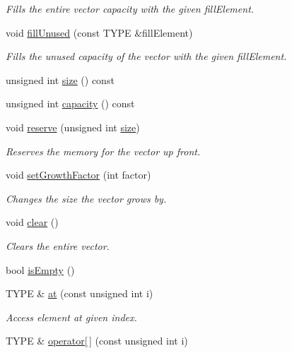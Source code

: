 \begin{DoxyCompactItemize}
\begin{DoxyCompactList}\small\item\em Fills the entire vector capacity with the given fill\+Element. \end{DoxyCompactList}\item 
void \hyperlink{classVECTOR_a82f4d38d7f35546e94e9d92654350c06}{fill\+Unused} (const T\+Y\+PE \&fill\+Element)
\begin{DoxyCompactList}\small\item\em Fills the unused capacity of the vector with the given fill\+Element. \end{DoxyCompactList}\item 
unsigned int \hyperlink{classVECTOR_a886dda1960ee8802b6151c66d531e01d}{size} () const 
\item 
unsigned int \hyperlink{classVECTOR_a6bc131f9067d07e45638247c95cc7ab0}{capacity} () const 
\item 
void \hyperlink{classVECTOR_a2e5af97d018d037dc6a0ceda0c3ed6c0}{reserve} (unsigned int \hyperlink{classVECTOR_a886dda1960ee8802b6151c66d531e01d}{size})
\begin{DoxyCompactList}\small\item\em Reserves the memory for the vector up front. \end{DoxyCompactList}\item 
void \hyperlink{classVECTOR_a74d13e9f54ae114408eb344b1918a1a4}{set\+Growth\+Factor} (int factor)
\begin{DoxyCompactList}\small\item\em Changes the size the vector grows by. \end{DoxyCompactList}\item 
void \hyperlink{classVECTOR_a0e2dc06d22af370c7f44f7b688a6ff6b}{clear} ()
\begin{DoxyCompactList}\small\item\em Clears the entire vector. \end{DoxyCompactList}\item 
bool \hyperlink{classVECTOR_ad103c9e2c6742aed3a3e2ee5021ac653}{is\+Empty} ()
\item 
T\+Y\+PE \& \hyperlink{classVECTOR_a717ffb0ccf66895d47c8b1f1bacb25da}{at} (const unsigned int i)
\begin{DoxyCompactList}\small\item\em Access element at given index. \end{DoxyCompactList}\item 
T\+Y\+PE \& \hyperlink{classVECTOR_ade7f7687236b0c7f0f0d10f1ef446847}{operator\mbox{[}$\,$\mbox{]}} (const unsigned int i)

\end{DoxyCompactItemize}

